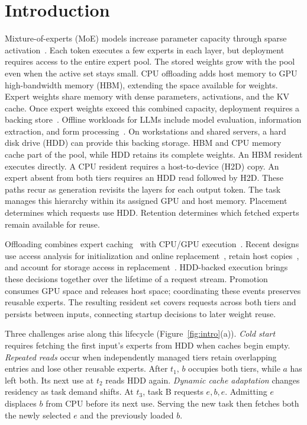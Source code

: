\section{Introduction}
Mixture-of-experts (MoE) models increase parameter capacity through sparse activation~\cite{shazeer,switch,mixtral,deepseekmoe}.
Each token executes a few experts in each layer, but deployment requires access to the entire expert pool.
The stored weights grow with the pool even when the active set stays small.
CPU offloading adds host memory to GPU high-bandwidth memory (HBM), extending the space available for weights.
Expert weights share memory with dense parameters, activations, and the KV cache.
Once expert weights exceed this combined capacity, deployment requires a backing store~\cite{flexgen}.
Offline workloads for LLMs include model evaluation, information extraction, and form processing~\cite{flexgen,lightning}.
On workstations and shared servers, a hard disk drive (HDD) can provide this backing storage.
HBM and CPU memory cache part of the pool, while HDD retains its complete weights.
An HBM resident executes directly.
A CPU resident requires a host-to-device (H2D) copy.
An expert absent from both tiers requires an HDD read followed by H2D.
These paths recur as generation revisits the layers for each output token.
The task manages this hierarchy within its assigned GPU and host memory.
Placement determines which requests use HDD.
Retention determines which fetched experts remain available for reuse.

Offloading combines expert caching~\cite{offloading,swapmoe,moeinfinity,promoe} with CPU/GPU execution~\cite{fiddler,daop,lightning}.
Recent designs use access analysis for initialization and online replacement~\cite{core}, retain host copies~\cite{ssdllama}, and account for storage access in replacement~\cite{flashmoe}.
HDD-backed execution brings these decisions together over the lifetime of a request stream.
Promotion consumes GPU space and releases host space; coordinating these events preserves reusable experts.
The resulting resident set covers requests across both tiers and persists between inputs, connecting startup decisions to later weight reuse.


Three challenges arise along this lifecycle (Figure~\ref{fig:intro}(a)).
\emph{Cold start} requires fetching the first input's experts from HDD when caches begin empty.
\emph{Repeated reads} occur when independently managed tiers retain overlapping entries and lose other reusable experts.
After $t_1$, $b$ occupies both tiers, while $a$ has left both.
Its next use at $t_2$ reads HDD again.
\emph{Dynamic cache adaptation} changes residency as task demand shifts.
At $t_3$, task B requests $e,b,e$.
Admitting $e$ displaces $b$ from CPU before its next use.
Serving the new task then fetches both the newly selected $e$ and the previously loaded $b$.

